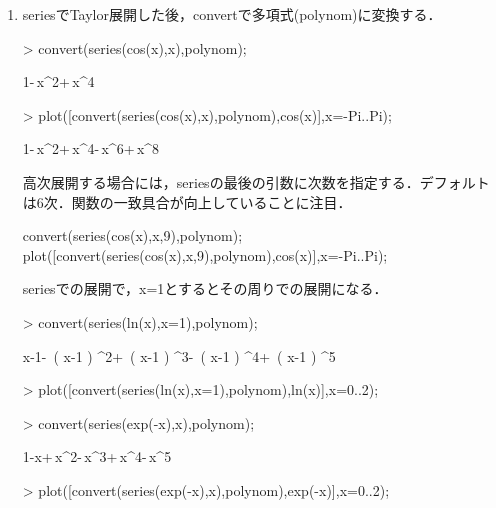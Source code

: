 \begin{enumerate}
\item seriesでTaylor展開した後，convertで多項式(polynom)に変換する．
\begin{MapleInput}
> convert(series(cos(x),x),polynom);
\end{MapleInput}
\begin{MapleOutput}
1-\,{x}^{2}+\,{x}^{4}
\end{MapleOutput}

\begin{MapleInput}
> plot([convert(series(cos(x),x),polynom),cos(x)],x=-Pi..Pi);
\end{MapleInput}
\begin{MapleOutput}
1-\,{x}^{2}+\,{x}^{4}-{}\,{x}^{6}+{}\,{x}^{8}
\end{MapleOutput}
高次展開する場合には，seriesの最後の引数に次数を指定する．デフォルトは6次．関数の一致具合が向上していることに注目．
\begin{MapleInput}
convert(series(cos(x),x,9),polynom);
plot([convert(series(cos(x),x,9),polynom),cos(x)],x=-Pi..Pi);
\end{MapleInput}

seriesでの展開で，x=1とするとその周りでの展開になる．
\begin{MapleInput}
> convert(series(ln(x),x=1),polynom);
\end{MapleInput}
\begin{MapleOutput}
x-1-\, \left( x-1 \right) ^{2}+\, \left( x-1 \right) ^{3}-\, \left( x-1 \right) ^{4}+\, \left( x-1 \right) ^{5}
\end{MapleOutput}

\begin{MapleInput}
> plot([convert(series(ln(x),x=1),polynom),ln(x)],x=0..2);
\end{MapleInput}

\begin{MapleInput}
> convert(series(exp(-x),x),polynom);
\end{MapleInput}
\begin{MapleOutput}
1-x+\,{x}^{2}-\,{x}^{3}+\,{x}^{4}-{}\,{x}^{5}
\end{MapleOutput}

\begin{MapleInput}
> plot([convert(series(exp(-x),x),polynom),exp(-x)],x=0..2);
\end{MapleInput}


\end{enumerate}
